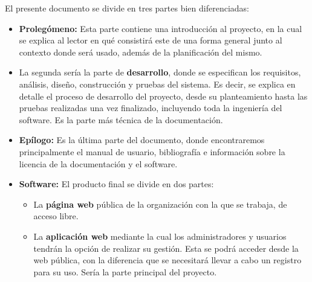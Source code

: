 El presente documento se divide en tres partes bien diferenciadas: 

\begin{itemize} 
\item \textbf{Prolegómeno:} Esta parte contiene una introducción al proyecto, en la cual se explica al lector en qué consistirá este de una forma general junto al contexto donde será usado, además de la planificación del mismo. 
\item La segunda sería la parte de \textbf{desarrollo}, donde se especifican los requisitos, análisis, diseño, construcción y pruebas del sistema. Es decir, se explica en detalle el proceso de desarrollo del proyecto, desde su planteamiento hasta las pruebas realizadas una vez finalizado, incluyendo toda la ingeniería del software. Es la parte más técnica de la documentación.
\item \textbf{Epílogo:} Es la última parte del documento, donde encontraremos principalmente el manual de usuario, bibliografía e información sobre la licencia de la documentación y el software.
 \item \textbf{Software:} El producto final se divide en dos partes: 
 \begin{itemize} 
\item La \textbf{página web} pública de la organización con la que se trabaja, de acceso libre.
\item La \textbf{aplicación web} mediante la cual los administradores y usuarios tendrán la opción de realizar su gestión. Esta se podrá acceder desde la web pública, con la diferencia que se necesitará llevar a cabo un registro para su uso. Sería la parte principal del proyecto.
\end {itemize}
\end {itemize}





